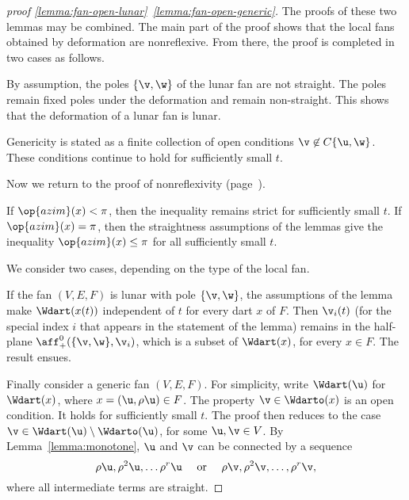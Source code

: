 \begin{proof}[proof \eqref{lemma:fan-open-lunar}~\eqref{lemma:fan-open-generic}] 
  The proofs of these two lemmas may be combined.  The main part of
  the proof shows that the local fans obtained by deformation are
  nonreflexive.  From there, the proof is completed in two cases as
  follows.

   By assumption, the poles $\{\v,\w\}$ of the lunar fan are not straight.
  The poles
  remain fixed poles under the deformation and remain non-straight.  This
  shows that the deformation of a lunar fan is lunar.

   Genericity is stated as a finite collection of
open conditions $\v\not\in
  C\{\u,\w\}$.  These conditions continue to hold for sufficiently
  small $t$.

Now we return to the proof of nonreflexivity (page~\pageref{def:convex-local}).

 If $\op{azim}(x)<\pi$, then the inequality remains
strict for sufficiently small $t$.  If $\op{azim}(x)=\pi$, then the
straightness assumptions of the lemmas give the inequality 
$\op{azim}(x)\le\pi$ for all sufficiently small $t$.

 We consider two cases, depending on the type of
the local fan.


If the fan $(V,E,F)$ is lunar with pole $\{\v,\w\}$, the assumptions
of the lemma make $\Wdart(x(t))$ independent of $t$ for every dart $x$
of $F$.  Then $\v_i(t)$ (for the special index $i$ that appears in the
statement of the lemma) remains in the half-plane
$\aff_+^0(\{\v,\w\},\v_i)$, which is a subset of $\Wdart(x)$,
for every $x\in F$.  The result ensues.

Finally consider a generic fan $(V,E,F)$.  For simplicity, write
$\Wdart(\u)$ for $\Wdart(x)$, where $x=(\u,\rho\u)\in F$.  The
property $\v\in \Wdarto(x)$ is an open condition.  It holds for
sufficiently small $t$.  The proof then reduces to the case
$\v\in \Wdart(\u)\setminus \Wdarto(\u)$, for some $\u,\v\in V$.  By
Lemma~\ref{lemma:monotone}, $\u$ and $\v$ can be connected by a
sequence
\[
\rho\u, \rho^2\u,\ldots \rho^r\u\quad\text{ or }\quad 
\rho\v, \rho^2\v,\ldots,\rho^r\v,
\]
where all intermediate terms are straight.


\end{proof}
